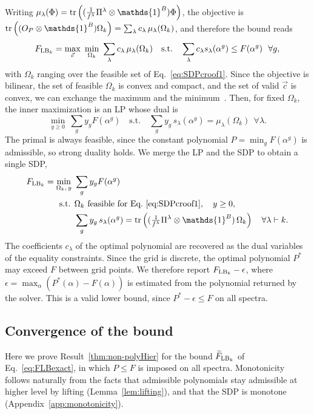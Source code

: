 \documentclass[aps,pra,onecolumn,superscriptaddress]{revtex4-2}
\newcommand{\one}{\mathds{1}}
\newcommand{\I}{\one}
\renewcommand{\a}{\alpha}
\begin{document}
\begin{widetext}
Writing $\mu_\lambda(\Phi)=\tr\left((\tfrac{1}{f^\lambda}\Pi^\lambda\otimes\I^B)\Phi\right)$, the objective is $\tr\left((O_P\otimes\I^B)\Omega_k\right)=\sum_\lambda c_\lambda\,\mu_\lambda(\Omega_k)$, and therefore  the bound reads
\begin{equation}
    F_{{\rm LB}_k}=\max_{\vec c}\ \min_{\Omega_k}\ \sum_\lambda c_\lambda\,\mu_\lambda(\Omega_k)
    \quad\text{s.t.}\quad \sum_\lambda c_\lambda s_\lambda(\a^g)\leq F(\a^g)\ \ \forall g,
\end{equation}
with $\Omega_k$ ranging over the feasible set of Eq.~\eqref{eq:SDPcroof1}. Since the objective is bilinear, the set of feasible $\Omega_k$ is convex and compact, and the set of valid $\vec{c}$ is convex, we can exchange the maximum and the minimum~\cite{Sion1958}. Then, for fixed $\Omega_k$, the inner maximization is an LP whose dual is
\begin{equation}
    \min_{y\geq0}\ \sum_g y_g F(\a^g)\quad\text{s.t.}\quad \sum_g y_g\,s_\lambda(\a^g)=\mu_\lambda(\Omega_k)\ \ \forall\lambda .
\end{equation}
The primal is always feasible, since the constant polynomial $P=\min_g F(\a^g)$ is admissible, so strong duality holds. We merge the LP and the SDP to obtain a single SDP,
\begin{align}
    F_{{\rm LB}_k}=\min_{\Omega_k,\,y}\ & \sum_g y_g F(\a^g)\\
    \text{s.t. }& \Omega_k\ \text{feasible for Eq.~\eqref{eq:SDPcroof1}},\quad y\geq0, \nonumber\\
    & \sum_g y_g\,s_\lambda(\a^g)=\tr\left((\tfrac{1}{f^\lambda}\Pi^\lambda\otimes\I^B)\,\Omega_k\right)\quad\forall\lambda\vdash k. \nonumber
\end{align}
The coefficients $c_\lambda$ of the optimal polynomial are recovered as the dual variables of the equality constraints. Since the grid is discrete, the optimal polynomial $P^*$ may exceed $F$ between grid points. We therefore report $F_{{\rm LB}_k}-\epsilon$, where $\epsilon=\max_\a\left(P^*(\a)-F(\a)\right)$ is estimated from the polynomial returned by the solver. This is a valid lower bound, since $P^*-\epsilon\leq F$ on all spectra.

\subsection{Convergence of the bound}\label{app:LPconvergence}
Here we prove Result~\ref{thm:non-polyHier} for the bound $\widetilde F_{{\rm LB}_k}$ of Eq.~\eqref{eq:FLBexact}, in which $P\leq F$ is imposed on all spectra. Monotonicity follows naturally from the facts that admissible polynomials stay admissible at higher level by lifting (Lemma~\ref{lem:lifting}), and that the SDP is monotone (Appendix~\ref{app:monotonicity}).


\end{widetext}
\end{document}
